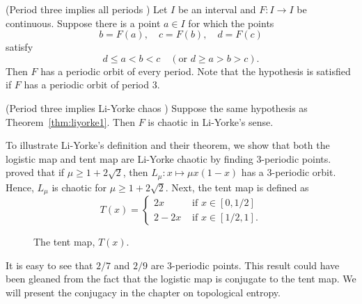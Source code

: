 \documentclass[12pt,draft,twoside]{book}
\begin{document}
\begin{theorem}
  (Period three implies all periods \citep{li-yorke})
  Let $I$ be an interval and $F: I\to I$ be continuous. Suppose there is a point $a \in I$ for which
  the points
  \begin{equation*}
  b = F(a), \quad c = F(b), \quad d = F(c)
  \end{equation*}
  satisfy
  \begin{equation*}
    d \leq a < b < c \quad(\mbox{or } d \geq a > b > c).
  \end{equation*}
  Then $F$ has a periodic orbit of every period.
  Note that the hypothesis is satisfied if $F$ has a periodic orbit of period 3.
  \label{thm:liyorke1}
\end{theorem}
\begin{theorem}
  (Period three implies Li-Yorke chaos \citep{li-yorke})
  Suppose the same hypothesis as Theorem~\ref{thm:liyorke1}.
  Then $F$ is chaotic in Li-Yorke's sense.
  \label{thm:liyorke2}
\end{theorem}
\begin{example}
  To illustrate Li-Yorke's definition and their theorem, we show that both the logistic map and tent map are Li-Yorke chaotic by finding 3-periodic points.
  \citet{saha} proved that if $\mu \geq 1 + 2\sqrt{2}$, then $L_\mu: x \mapsto \mu x(1-x)$ has a 3-periodic orbit.
  Hence, $L_\mu$ is chaotic for $\mu \geq 1 + 2\sqrt{2}$.
  Next, the tent map is defined as
  \begin{equation*}
    T(x) = 
    \begin{cases}
      2x     &\mbox{ if } x \in [0,1/2] \\
      2 - 2x &\mbox{ if } x \in [1/2,1].
    \end{cases}
  \end{equation*}

\begin{figure}[th]
  \centering
  \label{fig:tent-map}
  \caption{The tent map, $T(x)$.}
\end{figure}

  It is easy to see that $2/7$ and $2/9$ are 3-periodic points.
  This result could have been gleaned from the fact that the logistic map is conjugate to the tent map.
  We will present the conjugacy in the chapter on topological entropy.
\end{example}
\end{document}
